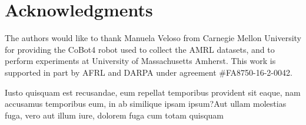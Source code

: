 \documentclass[letterpaper]{article} %
\theoremstyle{definition}
\begin{document}
\section{Acknowledgments}

The authors would like to thank Manuela Veloso from
Carnegie Mellon University for providing the CoBot4 robot
used to collect the AMRL datasets, and to perform experiments
at University of Massachusetts Amherst. This work is supported in part by AFRL
and DARPA under agreement \#FA8750-16-2-0042.

Iusto quisquam est recusandae, eum repellat temporibus provident sit eaque, nam accusamus temporibus eum, in ab similique ipsam ipsum?Aut ullam molestias fuga, vero aut illum iure, dolorem fuga cum totam quisquam


\end{document}
